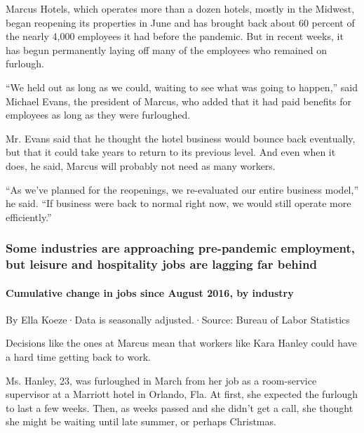 Marcus Hotels, which operates more than a dozen hotels, mostly in the
Midwest, began reopening its properties in June and has brought back
about 60 percent of the nearly 4,000 employees it had before the
pandemic. But in recent weeks, it has begun permanently laying off many
of the employees who remained on furlough.

``We held out as long as we could, waiting to see what was going to
happen,'' said Michael Evans, the president of Marcus, who added that it
had paid benefits for employees as long as they were furloughed.

Mr. Evans said that he thought the hotel business would bounce back
eventually, but that it could take years to return to its previous
level. And even when it does, he said, Marcus will probably not need as
many workers.

``As we've planned for the reopenings, we re-evaluated our entire
business model,'' he said. ``If business were back to normal right now,
we would still operate more efficiently.''

\hypertarget{some-industries-are-approaching-pre-pandemic-employment-but-leisure-and-hospitality-jobs-are-lagging-far-behind}{%
\subsubsection{Some industries are approaching pre-pandemic employment,
but leisure and hospitality jobs are lagging far
behind}\label{some-industries-are-approaching-pre-pandemic-employment-but-leisure-and-hospitality-jobs-are-lagging-far-behind}}

\hypertarget{cumulative-change-in-jobs-since-august-2016-by-industry}{%
\paragraph{Cumulative change in jobs since August 2016, by
industry}\label{cumulative-change-in-jobs-since-august-2016-by-industry}}

By Ella Koeze·Data is seasonally adjusted.·Source: Bureau of Labor
Statistics

Decisions like the ones at Marcus mean that workers like Kara Hanley
could have a hard time getting back to work.

Ms. Hanley, 23, was furloughed in March from her job as a room-service
supervisor at a Marriott hotel in Orlando, Fla. At first, she expected
the furlough to last a few weeks. Then, as weeks passed and she didn't
get a call, she thought she might be waiting until late summer, or
perhaps Christmas.

